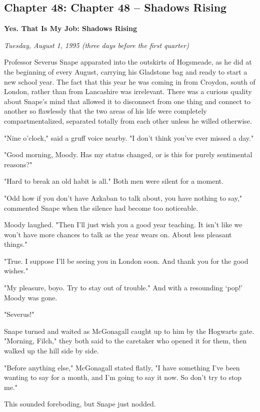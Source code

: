 \documentclass[a4paper,11pt]{article}
\begin{document}
\subsection{Chapter 48: Chapter 48 – Shadows Rising}

\textbf{Yes. That Is My Job: Shadows Rising}

\emph{Tuesday, August 1, 1995 (three days before the first quarter)}

Professor Severus Snape apparated into the outskirts of Hogsmeade, as he did at the beginning of every August, carrying his Gladstone bag and ready to start a new school year. The fact that this year he was coming in from Croydon, south of London, rather than from Lancashire was irrelevant. There was a curious quality about Snape's mind that allowed it to disconnect from one thing and connect to another so flawlessly that the two areas of his life were completely compartmentalized, separated totally from each other unless he willed otherwise.

"Nine o'clock," said a gruff voice nearby. "I don't think you've ever missed a day."

"Good morning, Moody. Has my status changed, or is this for purely sentimental reasons?"

"Hard to break an old habit is all." Both men were silent for a moment.

"Odd how if you don't have Azkaban to talk about, you have nothing to say," commented Snape when the silence had become too noticeable.

Moody laughed. "Then I'll just wish you a good year teaching. It isn't like we won't have more chances to talk as the year wears on. About less pleasant things."

"True. I suppose I'll be seeing you in London soon. And thank you for the good wishes."

"My pleasure, boyo. Try to stay out of trouble." And with a resounding `pop!' Moody was gone.

"Severus!"

Snape turned and waited as McGonagall caught up to him by the Hogwarts gate. "Morning, Filch," they both said to the caretaker who opened it for them, then walked up the hill side by side.

"Before anything else," McGonagall stated flatly, "I have something I've been wanting to say for a month, and I'm going to say it now. So don't try to stop me."

This sounded foreboding, but Snape just nodded.
\end{document}
